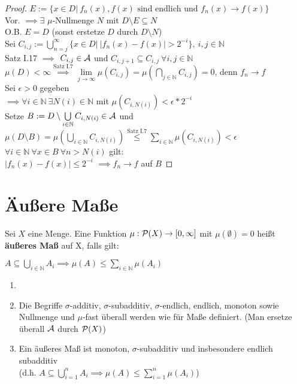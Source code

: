 \documentclass[11pt,a4paper,fleqn,openany]{report}
\begin{document}
    \begin{proof}
      $E := \{x \in D |\ f_n(x), f(x) \text{ sind endlich und } f_n(x) \to f(x)\}$\\
      Vor. $\implies \exists$ $\mu$-Nullmenge $N$ mit $D\setminus E \subseteq N$\\
      O.B. $E = D$ (sonst erstetze $D$ durch $D \setminus N$)\\
      Sei $C_{i,j} := \bigcup\limits_{n=j}^{\infty} \{x \in D |\ |f_n(x) - f(x)| > 2^{-i}\}, \ i,j \in \mathbb{N}$\\
      Satz I.17 $\implies$ $C_{i,j} \in \mathcal{A}$ und $C_{i,j+1} \subseteq C_{i,j} \ \forall i,j \in \mathbb{N}$\\
      $\mu(D) < \infty \stackrel{\text{Satz I.7}}{\implies} \lim\limits_{j \to \infty} \mu(C_{i,j}) = \mu(\bigcap\limits_{j \in \mathbb N} C_{i,j}) = 0$, denn $f_n \to f$\\
      Sei $\epsilon > 0$ gegeben\\
      $\implies \forall i \in \mathbb{N} \ \exists N(i) \in \mathbb{N}$ mit $\mu(C_{i,N(i)}) < \epsilon * 2^{-i}$\\
      Setze $B := D \setminus \bigcup\limits_{i \in \mathbb{N}} C_{i,N(i)} \in \mathcal{A}$ und $\mu(D \setminus B) = \mu(\bigcup\limits_{i \in \mathbb{N}} C_{i,N(i)}) \stackrel{\text{Satz I.7}}{\leq} \sum\limits_{i \in \mathbb{N}} \mu(C_{i,N(i)}) < \epsilon$\\
      $\forall i\in \mathbb{N} \ \forall x \in B \ \forall n>N(i)$ gilt:\\
      $|f_n(x) - f(x)| \leq 2^{-i}$
      $\implies f_n \to f$ auf $B$
    \end{proof}

  \chapter{Äußere Maße}
    \begin{definition}
      Sei $X$ eine Menge. Eine Funktion $\mu: \mathcal{P}(X) \to [0,\infty]$ mit $\mu(\emptyset)=0$ heißt \textbf{äußeres Maß} auf X, falls gilt:
      \begin{center}
        $A \subseteq \bigcup\limits_{i \in \mathbb{N}} A_i \implies \mu(A) \leq \sum\limits_{i \in \mathbb{N}} \mu(A_i)$
      \end{center}
    \end{definition}

    \begin{remark}
      \begin{enumerate}
        \item[]
        \item Die Begriffe $\sigma$-additiv, $\sigma$-subadditiv, $\sigma$-endlich, endlich, monoton sowie Nullmenge und $\mu$-fast überall werden wie für Maße definiert. (Man ersetze überall $\mathcal{A}$ durch $\mathcal{P}(X)$)
        \item Ein äußeres Maß ist monoton, $\sigma$-subadditiv und insbesondere endlich subadditiv\\
          (d.h. $A \subseteq \bigcup\limits_{i=1}^n A_i \implies \mu(A) \leq \sum\limits_{i = 1}^n \mu(A_i)$)
      \end{enumerate}
    \end{remark}
\end{document}
